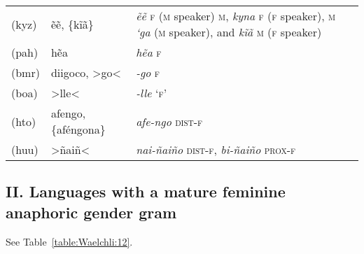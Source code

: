 {\begin{longtable}{L{.25\textwidth}L{.25\textwidth}L{.5\textwidth}}
 (kyz)	&	ẽẽ, \{kĩã\}	&	\textit{ẽẽ} \textsc{f} (\textsc{m} speaker) \textsc{m}, \textit{kyna} \textsc{f} (\textsc{f} speaker), \textsc{m} \textit{‘ga} (\textsc{m} speaker), and \textit{kĩã} \textsc{m} (\textsc{f} speaker)	\\
 (pah)	&	hẽa	&	\textit{hẽa} \textsc{f}	\\
 (bmr)	&	diigoco, >go<	&	\textit{-go} \textsc{f}	\\
 (boa)	&	>lle<	&	\textit{-lle} ‘\textsc{f}’	\\
 (hto)	&	afengo, \{aféngona\}	&	\textit{afe-ngo} \textsc{dist-f}	\\
  (huu)	&	>ñaiñ<	&	\textit{nai-ñaiño} \textsc{dist-f}, \textit{bi-ñaiño} \textsc{prox-f}	\\
\end{longtable}}


\subsection*{II. Languages with a mature feminine anaphoric gender gram \normalfont [128 languages]}

See Table~\ref{table:Waelchli:12}.

